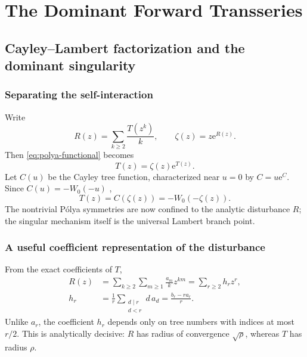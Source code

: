\documentclass[11pt,a4paper,oneside,openany]{book}
\theoremstyle{definition}
\theoremstyle{remark}
\newcommand{\e}{\mathrm e}
\begin{document}
\part{The Dominant Forward Transseries}

\chapter{Cayley--Lambert factorization and the dominant singularity}
\label{ch:factorization}

\section{Separating the self-interaction}
Write
\begin{equation}
 R(z)=\sum_{k\ge2}\frac{T(z^k)}k,
 \qquad
 \zeta(z)=z\e^{R(z)}.
 \label{eq:R-zeta}
\end{equation}
Then \cref{eq:polya-functional} becomes
\begin{equation}
 T(z)=\zeta(z)\e^{T(z)}.
 \label{eq:T-zeta}
\end{equation}
Let $C(u)$ be the Cayley tree function, characterized near $u=0$ by
$C=u\e^C$.  Since $C(u)=-W_0(-u)$ \cite{Corless1996,Genitrini2016},
\begin{equation}
 \boxed{T(z)=C(\zeta(z))=-W_0(-\zeta(z)).}
 \label{eq:Lambert-factorization}
\end{equation}
The nontrivial P\'olya symmetries are now confined to the analytic disturbance
$R$; the singular mechanism itself is the universal Lambert branch point.

\section{A useful coefficient representation of the disturbance}
From the exact coefficients of $T$,
\begin{align}
 R(z)
 &=\sum_{k\ge2}\sum_{m\ge1}\frac{a_m}{k}z^{km}
   =\sum_{r\ge2}h_rz^r,\label{eq:R-coeff}\\
 h_r
 &=\frac1r\sum_{\substack{d\mid r\\d<r}}d\,a_d
   =\frac{b_r-r a_r}{r}.
 \label{eq:h-coeff}
\end{align}
Unlike $a_r$, the coefficient $h_r$ depends only on tree numbers with indices at
most $r/2$.  This is analytically decisive: $R$ has radius of convergence
$\sqrt\rho$, whereas $T$ has radius $\rho$.
\end{document}
